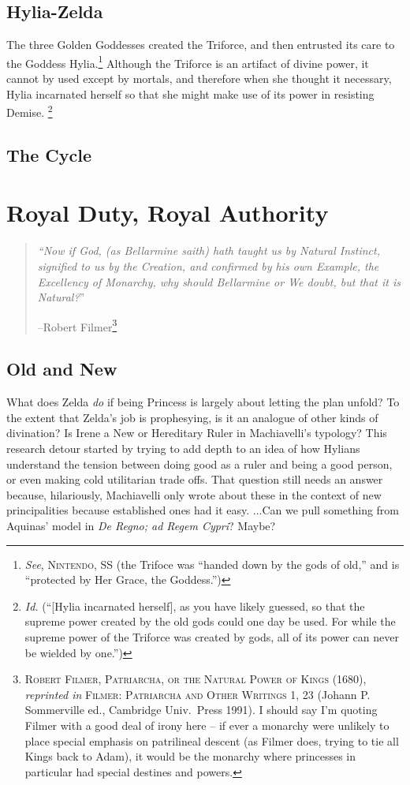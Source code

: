 \documentclass[../FGP.tex]{subfiles}
\begin{document}
\subsection{Hylia-Zelda}
The three Golden Goddesses created the Triforce, and then entrusted its care to the Goddess Hylia.\footnote{\textit{See}, \textsc{Nintendo, SS} (the Trifoce was ``handed down by the gods of old,'' and is ``protected by Her Grace, the Goddess.'')} Although the Triforce is an artifact of divine power, it cannot by used except by mortals, and therefore when she thought it necessary, Hylia incarnated herself so that she might make use of its power in resisting Demise.%
  \footnote{\textit{Id.} (``[Hylia incarnated herself], as you have likely guessed, so that the supreme power created by the old gods could one day be used. For while the supreme power of the Triforce was created by gods, all of its power can never be wielded by one.'')}
\subsection{The Cycle}

\section{Royal Duty, Royal Authority}\label{sec:world:royalduty} 
  \begin{quote}{\it
  ``Now if God, (as Bellarmine saith) hath taught us by Natural Instinct, signified to us by the Creation, and confirmed by his own Example, the Excellency of Monarchy, why should Bellarmine or We doubt, but that it is Natural?}''

  \hfill--Robert Filmer\footnote{\textsc{Robert Filmer, Patriarcha, or the Natural Power of Kings} (1680), \textit{reprinted in} \textsc{Filmer: Patriarcha and Other Writings} 1, 23 (Johann P. Sommerville ed., Cambridge Univ.~Press 1991). I should say I'm quoting Filmer with a good deal of irony here -- if ever a monarchy were unlikely to place special emphasis on patrilineal descent (as Filmer does, trying to tie all Kings back to Adam), it would be the monarchy where princesses in particular had special destines and powers.}
  \end{quote}

\subsection{Old and New} 

What does Zelda \emph{do} if being Princess is largely about letting the plan unfold?
To the extent that Zelda's job is prophesying, is it an analogue of other kinds of divination?
Is Irene a New or Hereditary Ruler in Machiavelli's typology?
This research detour started by trying to add depth to an idea of how Hylians understand the tension between doing good as a ruler and being a good person, or even making cold utilitarian trade offs. That question still needs an answer because, hilariously, Machiavelli only wrote about these in the context of new principalities because established ones had it easy. 
 ...Can we pull something from Aquinas' model in \textit{De Regno; ad Regem Cypri}? Maybe? 
\end{document}
